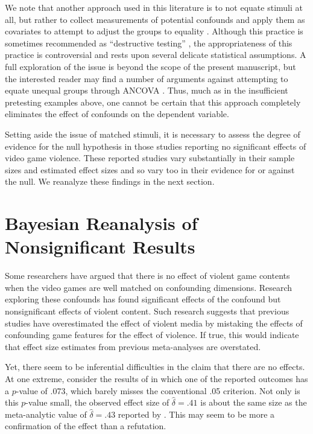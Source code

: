 \documentclass[man]{apa6}
\begin{document}
We note that another approach used in this literature is to not equate stimuli at all, but rather to collect measurements of potential confounds and apply them as covariates to attempt to adjust the groups to equality \citep[e.g.,][]{Bushman:Anderson:2002,Bushman:Anderson:2009,Carnagey:etal:2007,Sestir:Bartholow:2010}. Although this practice is sometimes recommended as ``destructive testing'' \citep{Anderson:Anderson:1996,Prot:Anderson:2013}, 
the appropriateness of this practice is controversial and rests upon several delicate statistical assumptions. A full exploration of the issue is beyond the scope of the present manuscript, but the interested reader may find a number of arguments against attempting to equate unequal groups through ANCOVA \citep[e.g.,][]{Miller:Chapman:2001}. 
Thus, much as in the insufficient pretesting examples above, one cannot be certain that this approach completely eliminates the effect of confounds on the dependent variable.

Setting aside the issue of matched stimuli, it is necessary to assess the degree of evidence for the null hypothesis in those studies reporting no significant effects of video game violence. These reported studies vary substantially in their sample sizes and estimated effect sizes and so vary too in their evidence for or against the null. We reanalyze these findings in the next section.

\section{Bayesian Reanalysis of Nonsignificant Results}
Some researchers have argued that there is no effect of violent game contents when the video games are well matched on confounding dimensions. Research exploring these confounds has found significant effects of the confound but nonsignificant effects of violent content. Such research suggests that previous studies have overestimated the effect of violent media by mistaking the effects of confounding game features for the effect of violence. If true, this would indicate that effect size estimates from previous meta-analyses \citep[e.g., $\hat{\delta} = 0.43$,][]{Anderson:etal:2010} are overstated.  

Yet, there seem to be inferential difficulties in the claim that there are no effects.  At one extreme, consider the results of \citet{Elson:etal:2013} in which one of the reported outcomes has a $p$-value of .073, which barely misses the conventional .05 criterion.  Not only is this $p$-value small, the observed effect size of $\hat{\delta}=.41$ is about the same size as the meta-analytic value of $\hat{\delta}=.43$ reported by \citet{Anderson:etal:2010}.  This may seem to be more a confirmation of the effect than a refutation.
\end{document}

